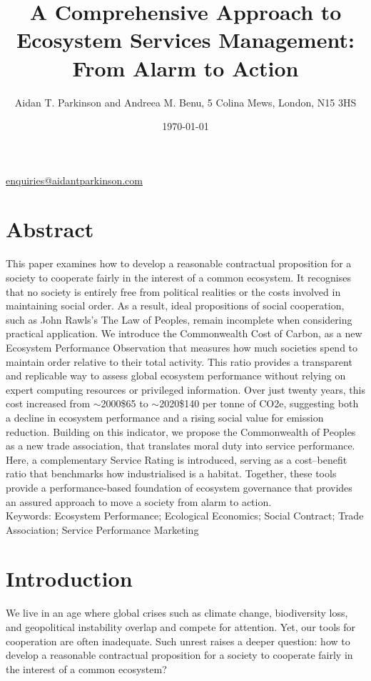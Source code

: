 \documentclass[10pt, oneside]{article}   	%
\title{A Comprehensive Approach to Ecosystem Services Management: From Alarm to Action}
\author{Aidan T. Parkinson and Andreea M. Benu, 5 Colina Mews, London, N15 3HS}
\date{\today}
\begin{document}
\maketitle
\begin{center}
\href{mailto:enquiries@aidantparkinson.com}{enquiries@aidantparkinson.com}
\end{center}

\section{Abstract}
This paper examines how to develop a reasonable contractual proposition for a society to cooperate fairly in the interest of a common ecosystem.
It recognises that no society is entirely free from political realities or the costs involved in maintaining social order.
As a result, ideal propositions of social cooperation, such as John Rawls’s The Law of Peoples, remain incomplete when considering practical application.
We introduce the Commonwealth Cost of Carbon, as a new Ecosystem Performance Observation that measures how much societies spend to maintain order relative to their total activity.
This ratio provides a transparent and replicable way to assess global ecosystem performance without relying on expert computing resources or privileged information.
Over just twenty years, this cost increased from $\sim$2000\$65 to $\sim$2020\$140 per tonne of CO2e, suggesting both a decline in ecosystem performance and a rising social value for emission reduction.
Building on this indicator, we propose the Commonwealth of Peoples as a new trade association, that translates moral duty into service performance.
Here, a complementary Service Rating is introduced, serving as a cost–benefit ratio that benchmarks how industrialised is a habitat.
Together, these tools provide a performance-based foundation of ecosystem governance that provides an assured approach to move a society from alarm to action.\\

Keywords: Ecosystem Performance; Ecological Economics; Social Contract; Trade Association; Service Performance Marketing\\

\section{Introduction}

We live in an age where global crises such as climate change, biodiversity loss, and geopolitical instability overlap and compete for attention.
Yet, our tools for cooperation are often inadequate.
Such unrest raises a deeper question: how to develop a reasonable contractual proposition for a society to cooperate fairly in the interest of a common ecosystem?\\
\end{document}
